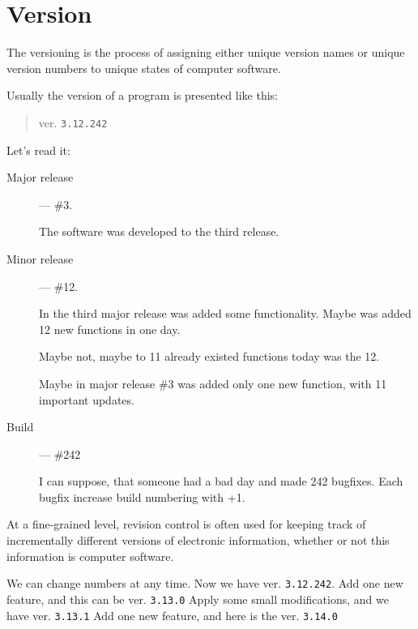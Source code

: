 \section{Version}
\label{sec:Version}

The versioning is the process of assigning either unique version names or unique version numbers to unique states of computer software. 

Usually the version of a program is presented like this: 

\begin{quote}
ver. \texttt{3.12.242}\end{quote} 

Let's read it:

\begin{description}
 \item[Major release] — \#3. 
 
 The software was developed to the third release.
 
 \item[Minor release] — \#12.
 
 In the third major release was added some functionality. Maybe was added 12 new functions in one day. 
 
 Maybe not, maybe to 11 already existed functions today was the 12. 
 
 Maybe in major release \#3 was added only one new function, with 11 important updates.

 \item[Build] — \#242 
 
 I can suppose, that someone had a bad day and made 242 bugfixes. Each bugfix increase build numbering with +1.
\end{description}

At a fine-grained level, revision control is often used for keeping track of incrementally different versions of electronic information, whether or not this information is computer software.

We can change numbers at any time. Now we have ver. \texttt{3.12.242}. Add one new feature, and this can be ver. \texttt{3.13.0} Apply some small modifications, and we have ver. \texttt{3.13.1} Add one new feature, and here is the ver. \texttt{3.14.0} 